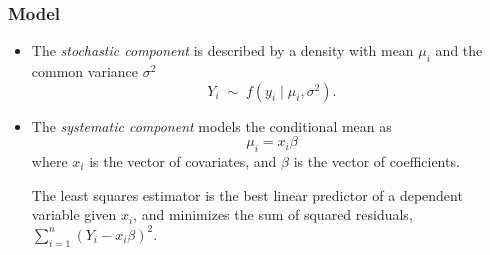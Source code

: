 \begin{enumerate}


\end{enumerate}

\subsubsection{Model}
\begin{itemize}
\item The \emph{stochastic component} is described by a density
  with mean $\mu_i$ and the common variance $\sigma^2$
  \begin{equation*}
    Y_i \; \sim \; f(y_i \mid \mu_i, \sigma^2).
  \end{equation*}
\item The \emph{systematic component} models the conditional mean as
  \begin{equation*}
     \mu_i =  x_i \beta
  \end{equation*} 
  where $x_i$ is the vector of covariates, and $\beta$ is the vector
  of coefficients.
  
  The least squares estimator is the best linear predictor of a
  dependent variable given $x_i$, and minimizes the sum of squared
  residuals, $\sum_{i=1}^n (Y_i-x_i \beta)^2$.  
\end{itemize}

